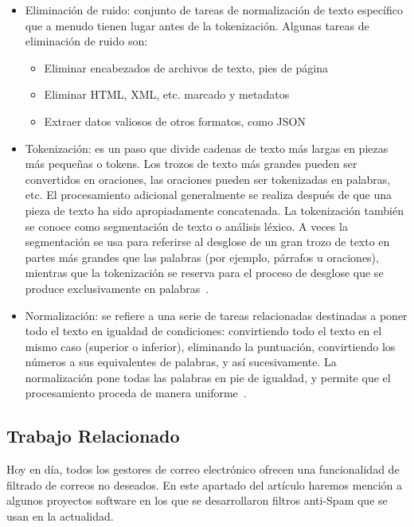 \documentclass[conference,a4paper]{IEEEtran}
\begin{document}
\begin{itemize}
\item Eliminación de ruido: conjunto de tareas de normalización de texto específico que a menudo tienen lugar antes de la tokenización. Algunas tareas de eliminación de ruido son:
\begin{itemize}
\item Eliminar encabezados de archivos de texto, pies de página
\item Eliminar HTML, XML, etc. marcado y metadatos
\item Extraer datos valiosos de otros formatos, como JSON 
~\cite{b8}
\end{itemize} 

\item Tokenización: es un paso que divide cadenas de texto más largas en piezas más pequeñas o tokens. Los trozos de texto más grandes pueden ser convertidos en oraciones, las oraciones pueden ser tokenizadas en palabras, etc. El procesamiento adicional generalmente se realiza después de que una pieza de texto ha sido apropiadamente concatenada. La tokenización también se conoce como segmentación de texto o análisis léxico. A veces la segmentación se usa para referirse al desglose de un gran trozo de texto en partes más grandes que las palabras (por ejemplo, párrafos u oraciones), mientras que la tokenización se reserva para el proceso de desglose que se produce exclusivamente en palabras~\cite{b9}.

\item Normalización: se refiere a una serie de tareas relacionadas destinadas a poner todo el texto en igualdad de condiciones: convirtiendo todo el texto en el mismo caso (superior o inferior), eliminando la puntuación, convirtiendo los números a sus equivalentes de palabras, y así sucesivamente. La normalización pone todas las palabras en pie de igualdad, y permite que el procesamiento proceda de manera uniforme~\cite{b10}.
\end{itemize}                                                         
                                                           
                                                            


\subsection{Trabajo Relacionado}




Hoy en día, todos los gestores de correo electrónico ofrecen una funcionalidad de filtrado de correos no deseados. En este apartado del artículo haremos mención a algunos proyectos software en los que se desarrollaron filtros anti-Spam que se usan en la actualidad.
\end{document}
